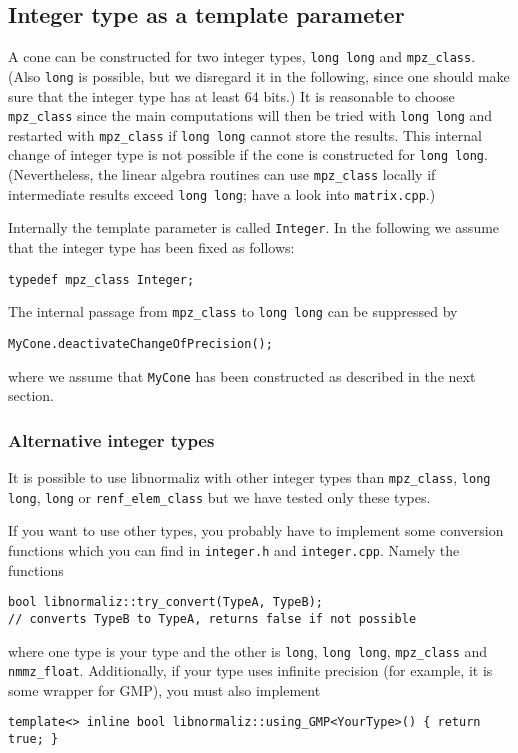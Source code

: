 \documentclass[12pt,a4paper]{scrartcl}
\theoremstyle{definition}
\begin{document}
\begin{small}
\subsection{Integer type as a template parameter}

A cone can be constructed for two integer types, \verb|long long| and \verb|mpz_class|. (Also \verb|long| is possible, but we disregard it in the following, since one should make sure that the integer type has at least 64 bits.) It is reasonable to choose \verb|mpz_class| since the main computations will then be tried with \verb|long long| and restarted with \verb|mpz_class| if \verb|long long| cannot store the results. This internal change of integer type is not possible if the cone is constructed for \verb|long long|. (Nevertheless, the linear algebra routines can use \verb|mpz_class| locally if intermediate results exceed \verb|long long|; have a look into \verb|matrix.cpp|.)

Internally the template parameter is called \verb|Integer|. In the following we assume that the integer type has been fixed as follows:
\begin{Verbatim}
typedef mpz_class Integer;
\end{Verbatim}

The internal passage from \verb|mpz_class| to \verb|long long| can be suppressed by
\begin{Verbatim}
MyCone.deactivateChangeOfPrecision();
\end{Verbatim}
where we assume that \verb|MyCone| has been constructed as described in the next section.

\subsubsection{Alternative integer types}

It is possible to use libnormaliz with other integer types than \verb|mpz_class|,  \verb|long long|, \verb|long| or \verb|renf_elem_class| but we have tested only these types.

If you want to use other types, you probably have to implement some conversion functions which you can find in \verb|integer.h| and \verb|integer.cpp|. Namely the functions
\begin{Verbatim}
bool libnormaliz::try_convert(TypeA, TypeB); 
// converts TypeB to TypeA, returns false if not possible
\end{Verbatim}
where one type is your type and the other is \verb|long|, \verb|long long|, \verb|mpz_class| and \verb|nmmz_float|.
Additionally, if your type uses infinite precision (for example, it is some wrapper for GMP), you must also implement
\begin{Verbatim}
template<> inline bool libnormaliz::using_GMP<YourType>() { return true; }
\end{Verbatim}


\end{small}
\end{document}
